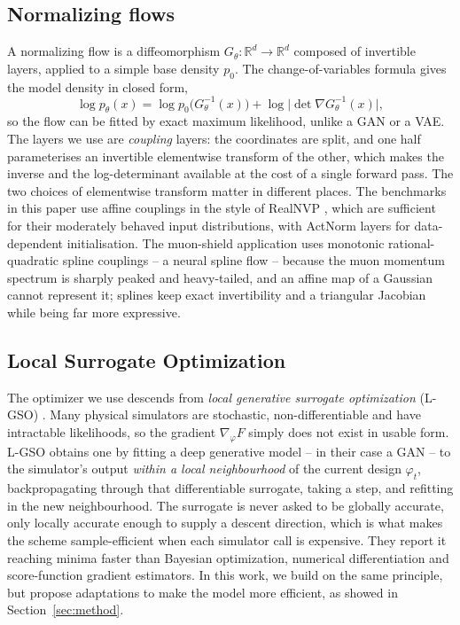 \documentclass[11pt]{article}
\newcommand{\R}{\mathbb{R}}
\newcommand{\design}{\varphi}
\newcommand{\base}{p_0}
\begin{document}
\subsection{Normalizing flows}
A normalizing flow \citep{rezende2015,papamakarios2021} is a diffeomorphism
$G_\theta:\R^{d}\to\R^{d}$ composed of invertible layers, applied to a simple base density
$\base$. The change-of-variables formula gives the model density in closed form,
\begin{equation}
  \label{eq:cov}
  \log p_\theta(x) = \log \base\big(G_\theta^{-1}(x)\big)
                     + \log\big|\det \nabla G_\theta^{-1}(x)\big|,
\end{equation}
so the flow can be fitted by exact maximum likelihood, unlike a GAN or a VAE. The layers we
use are \emph{coupling} layers: the coordinates are split, and one half parameterises an
invertible elementwise transform of the other, which makes the inverse and the
log-determinant available at the cost of a single forward pass. The two choices of
elementwise transform matter in different places. The benchmarks in this paper use affine
couplings in the style of RealNVP \citep{dinh2017}, which are sufficient for their
moderately behaved input distributions, with ActNorm layers \citep{kingma2018} for
data-dependent initialisation. The muon-shield application uses monotonic
rational-quadratic spline couplings -- a neural spline flow \citep{durkan2019} -- because
the muon momentum spectrum is sharply peaked and heavy-tailed, and an affine map of a
Gaussian cannot represent it; splines keep exact invertibility and a triangular Jacobian
while being far more expressive.



\subsection{Local Surrogate Optimization}
\label{sec:lgso}
The optimizer we use descends from \emph{local generative surrogate optimization} (L-GSO)
\citep{shirobokov2020}. Many physical simulators are stochastic, non-differentiable and have intractable likelihoods, so the gradient
$\nabla_\design F$ simply does not exist in usable form. L-GSO obtains one by fitting a deep
generative model -- in their case a GAN -- to the simulator's output \emph{within a local
neighbourhood} of the current design $\design_t$, backpropagating through that differentiable
surrogate, taking a step, and refitting in the new neighbourhood. The surrogate is never
asked to be globally accurate, only locally accurate enough to supply a descent direction,
which is what makes the scheme sample-efficient when each simulator call is expensive. They
report it reaching minima faster than Bayesian optimization, numerical differentiation and
score-function gradient estimators. In this work, we build on the same principle, but propose adaptations to make the model more efficient, as showed in Section~\ref{sec:method}.
\end{document}
